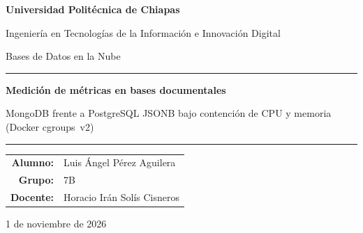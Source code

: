 \documentclass[11pt,letterpaper]{article}
\begin{document}
\hypersetup{pageanchor=false}
\begin{titlepage}
\centering
{\LARGE\bfseries Universidad Politécnica de Chiapas\par}
\vspace{0.6cm}
{\large Ingeniería en Tecnologías de la Información e Innovación Digital\par}
\vspace{0.3cm}
{\large Bases de Datos en la Nube\par}

\vfill
\rule{\linewidth}{0.6pt}\par\vspace{0.5cm}
{\huge\bfseries Medición de métricas en bases documentales\par}
\vspace{0.4cm}
{\Large MongoDB frente a PostgreSQL JSONB bajo contención de CPU y memoria (Docker cgroups~v2)\par}
\vspace{0.5cm}\rule{\linewidth}{0.6pt}\par
\vfill

\begin{tabular}{rl}
\textbf{Alumno:}  & Luis Ángel Pérez Aguilera \\[4pt]
\textbf{Grupo:}   & 7B \\[4pt]
\textbf{Docente:} & Horacio Irán Solís Cisneros \\
\end{tabular}

\vfill
{\large 1 de noviembre de 2026\par}
\end{titlepage}
\hypersetup{pageanchor=true}

\begin{abstract}
\noindent Se comparan MongoDB~9.0.4 y PostgreSQL~18.6 (JSONB) al ejecutar dos agregaciones sobre
500\,000 documentos JSON con tres niveles de anidamiento, bajo tres perfiles de recursos impuestos
con cgroups~v2: A (4~CPU / 4\,GB), B (2~CPU / 2\,GB) y C (1~CPU / 1\,GB). Cada celda de la matriz
(2 motores $\times$ 3 perfiles $\times$ 2 consultas $\times$ 3 concurrencias, más las dos
variantes de memoria de Q2) se midió tres veces con el ciclo
\emph{flush} $\rightarrow$ warmup 60\,s $\rightarrow$ medición 300\,s $\rightarrow$ cooldown 60\,s:
162 corridas en total. La agregación con desanidado (Q1) separa a los motores: MongoDB la
resuelve en flujo con $\sim$128\,KB de memoria de agrupación y queda limitada solo por CPU, mientras
que PostgreSQL ordena filas completas con \emph{external merge}, escribe del orden de 1\,GB
temporal por consulta y, con 1\,GB y 50 clientes, termina en OOM. El Top-1000 (Q2) no produce
spill en ningún motor ni variante: ambos lo resuelven con un ordenamiento top-$k$ de menos de
1,1\,MB, y el límite de CPU domina su latencia.
\end{abstract}
\end{document}
